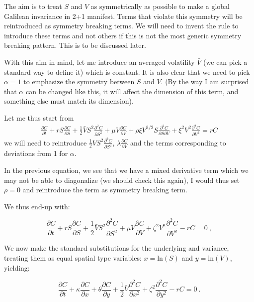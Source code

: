 \documentclass[english,12pt]{article}
\begin{document}
The aim is to treat $S$ and $V$ as symmetrically as possible to make a global Galilean invariance in 2+1 manifest. Terms that violate this symmetry will be reintroduced as symmetry breaking terms. We will need to invent the rule to introduce these terms and not others if this is not the most generic symmetry breaking pattern. This is to be discussed later.

With this aim in mind, let me introduce an averaged volatility $\bar V$ (we can pick a standard way to define it) which is constant.  It is also clear that we need to pick $\alpha=1$  to emphasize the symmetry between $S$ and $V$. (By the way I am surprised that $\alpha$ can be changed like this, it will affect the dimension of this term, and something else must match its dimension).

Let me thus start from 
\begin{eqnarray}
\label{full merton} \frac{\partial C}{\partial t}+ r S \frac{\partial C}{\partial S} + \frac{1}{2} \bar V S^2 \frac{\partial^2 C}{\partial S^2} +\mu V \frac{\partial C}{\partial V} +\rho \xi V^{3/2} S \frac{\partial^2 C}{\partial S \partial V} +\xi^2 V^{2}  \frac{\partial^2 C}{\partial V^2}= r C
\end{eqnarray}
we will need to reintroduce $\frac{1}{2} V S^2 \frac{\partial^2 C}{\partial S^2}$,  $\lambda \frac{\partial C}{\partial V} $ and the terms corresponding to deviations from 1 for $\alpha$.

In the previous equation, we see that we have a mixed derivative term which we may not be able to diagonalize (we should check this again), I would thus set $\rho=0$ and reintroduce the term as symmetry breaking term. 

We thus end-up with:

\begin{equation}
\frac{\partial C}{\partial t} + rS\frac{\partial C}{\partial S} + \frac{1}{2}\bar{V}S^{2}\frac{\partial^2 C}{\partial S^2} + \mu V \frac{\partial C}{\partial V} + \zeta^2 V^2 \frac{\partial^2 C}{\partial V^2} - rC = 0~,
\end{equation}


We now make the standard substitutions for the underlying and variance, treating them as equal spatial type variables: $x = \text{ln}(S)$ and $y = \text{ln}(V)$, yielding:

\begin{equation}
\frac{\partial C}{\partial t} + \kappa \frac{\partial C}{\partial x} + \theta \frac{\partial C}{\partial y} + \frac{1}{2}\bar{V}\frac{\partial^2 C}{\partial x^2} + \zeta^2 \frac{\partial^2 C}{\partial y^2} - rC = 0~.
\end{equation}
\end{document}
